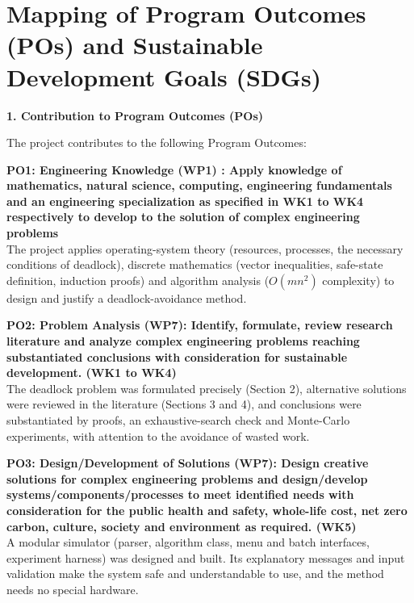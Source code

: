 \documentclass[11pt,a4paper]{report}
\providecommand{\phantomsection}{}
\begin{document}
\clearpage
\phantomsection
{}
\chapter*{Mapping of Program Outcomes (POs) and Sustainable Development Goals (SDGs)}

\noindent\textbf{1. Contribution to Program Outcomes (POs)}

The project contributes to the following Program Outcomes:

\bigskip
\noindent\textbf{PO1: Engineering Knowledge (WP1) : Apply knowledge of mathematics, natural science, computing, engineering fundamentals and an engineering specialization as specified in WK1 to WK4 respectively to develop to the solution of complex engineering problems}\\
The project applies operating-system theory (resources, processes, the necessary conditions of deadlock), discrete mathematics (vector inequalities, safe-state definition, induction proofs) and algorithm analysis ($O(mn^2)$ complexity) to design and justify a deadlock-avoidance method.

\bigskip
\noindent\textbf{PO2: Problem Analysis (WP7): Identify, formulate, review research literature and analyze complex engineering problems reaching substantiated conclusions with consideration for sustainable development. (WK1 to WK4)}\\
The deadlock problem was formulated precisely (Section 2), alternative solutions were reviewed in the literature (Sections 3 and 4), and conclusions were substantiated by proofs, an exhaustive-search check and Monte-Carlo experiments, with attention to the avoidance of wasted work.

\bigskip
\noindent\textbf{PO3: Design/Development of Solutions (WP7): Design creative solutions for complex engineering problems and design/develop systems/components/processes to meet identified needs with consideration for the public health and safety, whole-life cost, net zero carbon, culture, society and environment as required. (WK5)}\\
A modular simulator (parser, algorithm class, menu and batch interfaces, experiment harness) was designed and built. Its explanatory messages and input validation make the system safe and understandable to use, and the method needs no special hardware.
\end{document}
